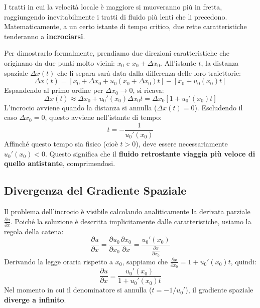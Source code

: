 I tratti in cui la velocità locale è maggiore si muoveranno più in fretta, raggiungendo inevitabilmente i tratti di fluido più lenti che li precedono. Matematicamente, a un certo istante di tempo critico, due rette caratteristiche tenderanno a \textbf{incrociarsi}.

Per dimostrarlo formalmente, prendiamo due direzioni caratteristiche che originano da due punti molto vicini: $x_0$ e $x_0 + \Delta x_0$. All'istante $t$, la distanza spaziale $\Delta x(t)$ che li separa sarà data dalla differenza delle loro traiettorie:
\begin{equation}
\Delta x(t) = [x_0 + \Delta x_0 + u_0(x_0 + \Delta x_0)t] - [x_0 + u_0(x_0)t]
\end{equation}
Espandendo al primo ordine per $\Delta x_0 \to 0$, si ricava:
\begin{equation}
\Delta x(t) \approx \Delta x_0 + u_0'(x_0) \Delta x_0 t = \Delta x_0 [1 + u_0'(x_0) t]
\end{equation}
L'incrocio avviene quando la distanza si annulla ($\Delta x(t) = 0$). Escludendo il caso $\Delta x_0 = 0$, questo avviene nell'istante di tempo:
\begin{equation}
t = -\frac{1}{u_0'(x_0)}
\end{equation}
Affinché questo tempo sia fisico (cioè $t > 0$), deve essere necessariamente $u_0'(x_0) < 0$. Questo significa che il \textbf{fluido retrostante viaggia più veloce di quello antistante}, comprimendosi.

\subsection{Divergenza del Gradiente Spaziale}
Il problema dell'incrocio è visibile calcolando analiticamente la derivata parziale $\frac{\partial u}{\partial x}$. Poiché la soluzione è descritta implicitamente dalle caratteristiche, usiamo la regola della catena:
\begin{equation}
\frac{\partial u}{\partial x} = \frac{\partial u_0}{\partial x_0} \frac{\partial x_0}{\partial x} = \frac{u_0'(x_0)}{\frac{\partial x}{\partial x_0}}
\end{equation}
Derivando la legge oraria rispetto a $x_0$, sappiamo che $\frac{\partial x}{\partial x_0} = 1 + u_0'(x_0)t$, quindi:
\begin{equation}
\frac{\partial u}{\partial x} = \frac{u_0'(x_0)}{1 + u_0'(x_0)t}
\end{equation}
Nel momento in cui il denominatore si annulla ($t = -1/u_0'$), il gradiente spaziale \textbf{diverge a infinito}.

